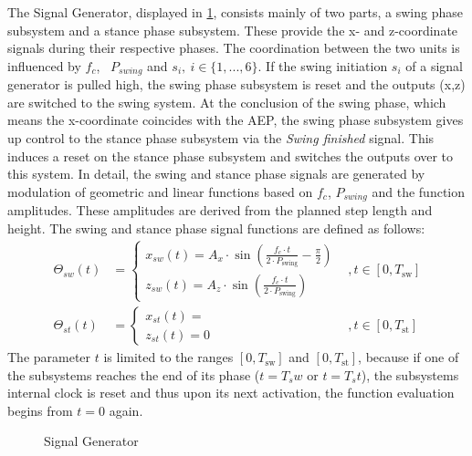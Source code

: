 The Signal Generator, displayed in \ref{figure: Signal Generator}, consists mainly of two parts, a swing phase subsystem and a stance phase subsystem.
These provide the x- and z-coordinate signals during their respective phases.
The coordination between the two units is influenced by $f_c$, \ $P_{swing}$ and $s_i,\ i \in \{1,...,6\}$.
If the swing initiation $s_i$ of a signal generator is pulled high, the swing phase subsystem is reset and the outputs (x,z) are switched to the swing system.
At the conclusion of the swing phase, which means the x-coordinate coincides with the AEP, the swing phase subsystem gives up control to the stance phase subsystem via the \textit{Swing finished} signal.
This induces a reset on the stance phase subsystem and switches the outputs over to this system.
In detail, the swing and stance phase signals are generated by modulation of geometric and linear functions based on $f_c$, $P_{swing}$ and the function amplitudes.
These amplitudes are derived from the planned step length and height.
The swing and stance phase signal functions are defined as follows:
\begin{align}
	\Theta_{sw}(t) & = 
	\begin{cases}
		x_{sw}(t) = A_x \cdot \sin(\frac{f_c \cdot t} {2 \cdot P_{\text{swing}}} - \frac{\pi}{2})\\
		z_{sw}(t) = A_z \cdot \sin(\frac{f_c \cdot t} {2 \cdot P_{\text{swing}}})
	\end{cases} & , t \in [0,T_\text{sw}] 
	\\
	\Theta_{st}(t) & =
	\begin{cases}
		x_{st}(t) = \\
		z_{st}(t) = 0
	\end{cases} & , t \in [0, T_\text{st}]    
\end{align}
The parameter $t$ is limited to the ranges $[0,T_\text{sw}]$ and $[0, T_\text{st}]$, because if one of the subsystems reaches the end of its phase ($t=T_sw$ or $t=T_st$), the subsystems internal clock is reset and thus upon its next activation, the function evaluation begins from $t=0$ again.


\begin{figure}[!h]
	\centerline{}
	\caption{Signal Generator}
	\label{figure: Signal Generator}
\end{figure}

